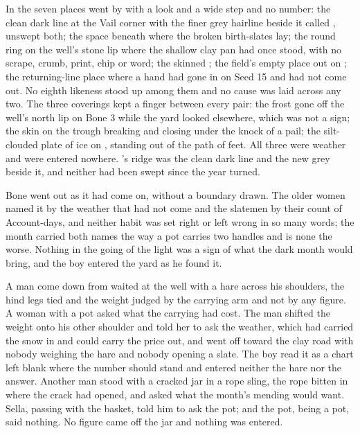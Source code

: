 In  the seven places went by with a look and a wide step and no number: the clean dark line at the Vail corner with the finer grey hairline beside it called , unswept both; the space beneath  where the broken birth-slates lay; the round ring on the well's stone lip where the shallow clay pan had once stood, with no scrape, crumb, print, chip or word; the skinned ; the field's empty place out on ; the returning-line place where a hand had gone in on Seed 15 and had not come out. No eighth likeness stood up among them and no cause was laid across any two. The three coverings kept a finger between every pair: the frost gone off the well's north lip on Bone 3 while the yard looked elsewhere, which was not a sign; the skin on the trough breaking and closing under the knock of a pail; the silt-clouded plate of ice on , standing out of the path of feet. All three were weather and were entered nowhere. 's ridge was the clean dark line and the new grey beside it, and neither had been swept since the year turned.

Bone went out as it had come on, without a boundary drawn. The older women named it by the weather that had not come and the slatemen by their count of Account-days, and neither habit was set right or left wrong in so many words; the month carried both names the way a pot carries two handles and is none the worse. Nothing in the going of the light was a sign of what the dark month would bring, and the boy entered the yard as he found it.

\scenebreak

A man come down from  waited at the well with a hare across his shoulders, the hind legs tied and the weight judged by the carrying arm and not by any figure. A woman with a pot asked what the carrying had cost. The man shifted the weight onto his other shoulder and told her to ask the weather, which had carried the snow in and could carry the price out, and went off toward the clay road with nobody weighing the hare and nobody opening a slate. The boy read it as a chart left blank where the number should stand and entered neither the hare nor the answer. Another man stood with a cracked jar in a rope sling, the rope bitten in where the crack had opened, and asked what the month's mending would want. Sella, passing with the basket, told him to ask the pot; and the pot, being a pot, said nothing. No figure came off the jar and nothing was entered.

